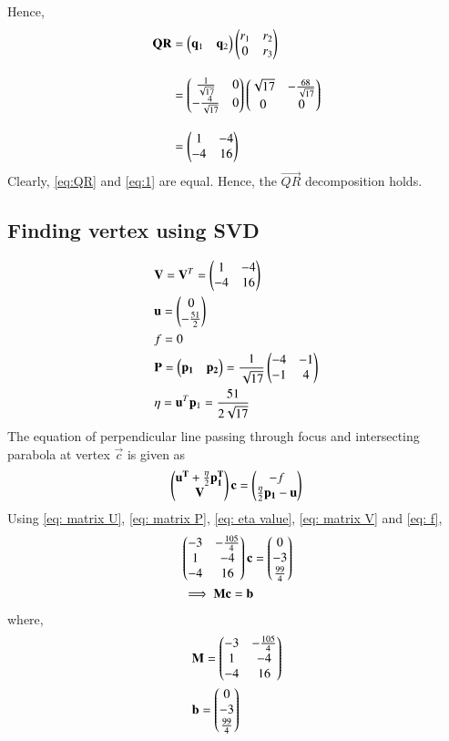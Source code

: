 \documentclass[journal,12pt,twocolumn]{IEEEtran}
\begin{document}
Hence, 
\begin{align}
    \mathbf{QR} &= \begin{pmatrix}\mathbf q_1 & \mathbf q_2\end{pmatrix} \begin{pmatrix}r_1 & r_2\\ 0 & r_3\end{pmatrix}\\[1em]
    &= \begin{pmatrix}\frac{1}{\sqrt{17}} & 0 \\ -\frac{4}{\sqrt{17}} & 0\end{pmatrix} \begin{pmatrix}\sqrt{17} & -\frac{68}{\sqrt{17}}\\0 & 0\end{pmatrix}\\[1em]
    &= \begin{pmatrix}1 & -4\\ -4 & 16\end{pmatrix} \label{eq:QR}
\end{align}
Clearly, \eqref{eq:QR} and \eqref{eq:1} are equal. Hence, the $\vec{QR}$ decomposition holds.
\subsection{Finding vertex using SVD}
\begin{align}
    &\mathbf{V} = \mathbf V^T= \begin{pmatrix}1&-4\\-4&16\end{pmatrix}\label{eq: matrix V}\\ 
    &\mathbf{u} = \begin{pmatrix}0\\-\frac{51}{2}\end{pmatrix}\label{eq: matrix U} \\ 
    &f = 0 \label{eq: f}\\
    &\mathbf{P}=\begin{pmatrix}\mathbf{p_1}&\mathbf{p_2}\end{pmatrix}=\frac{1}{\sqrt{17}}\begin{pmatrix}-4&-1\\ -1 & 4\end{pmatrix}\label{eq: matrix P}\\
    &\eta= \mathbf u^T \mathbf p_1 = \frac{51}{2\sqrt{17}}\label{eq: eta value}
\end{align}
The equation of perpendicular line passing through focus and intersecting parabola at vertex $\vec c$ is given as
\begin{align}
    \begin{pmatrix}\mathbf{u^T}+\frac{\eta}{2}\mathbf{p_1^T} \\ \mathbf{V}\end{pmatrix}\mathbf{c}=\begin{pmatrix}-f \\ \frac{\eta}{2}\mathbf{p_1}-\mathbf{u}\end{pmatrix} 
\end{align}
Using \eqref{eq: matrix U}, \eqref{eq: matrix P}, \eqref{eq: eta value}, \eqref{eq: matrix V} and \eqref{eq: f},
\begin{align}
    &\begin{pmatrix}-3 & -\frac{105}{4}\\1 & -4\\-4 & 16\end{pmatrix}\mathbf c = \begin{pmatrix}0\\-3\\\frac{99}{4}\end{pmatrix}\\
    &\implies \mathbf M \mathbf c= \mathbf b\label{eq: Mc=b}
\end{align}
where, 
\begin{align}
    &\mathbf M = \begin{pmatrix}-3 & -\frac{105}{4}\\1 & -4\\-4 & 16\end{pmatrix}\\
    &\mathbf b = \begin{pmatrix}0\\-3\\\frac{99}{4}\end{pmatrix}
\end{align}
\end{document}
